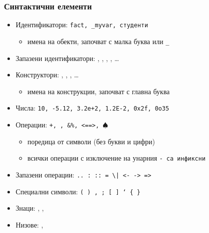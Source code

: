 \documentclass[alsotrans]{beamerswitch}
\begin{document}
\begin{frame}[fragile]
  \frametitle{Синтактични елементи}

  \begin{itemize}[<+->]
  \item Идентификатори: \tt{fact}, \tt{\_myvar}, \tt{студенти}
    \begin{itemize}
    \item имена на обекти, започват с малка буква или \tt\_
    \end{itemize}
  \item Запазени идентификатори: , , , , \ldots
  \item Конструктори: , , , \ldots
    \begin{itemize}
    \item имена на конструкции, започват с главна буква
    \end{itemize}
  \item Числа: \tt{10}, \tt{-5.12}, \tt{3.2e+2}, \tt{1.2E-2}, \tt{0x2f}, \tt{0o35}
  \item Операции: \tt+, \tt*, \tt{\&\%}, \tt{<==>}, \tt{$\spadesuit$}
    \begin{itemize}
    \item поредица от символи (без букви и цифри)
    \item всички операции с изключение на унарния \tt- са инфиксни
    \end{itemize}
  \item Запазени операции: \tt{..} \tt: \tt{::} \tt= \tt\textbackslash \tt| \tt{<-} \tt{->} \tt@ \tt\~ \tt{=>}
  \item Специални символи: \tt( \tt) \tt, \tt; \tt[ \tt] \tt` \tt\{ \tt\}
  \item Знаци: , , 
  \item Низове: , 
  \end{itemize}
\end{frame}
\end{document}
